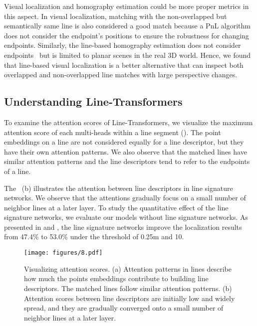 \documentclass[letterpaper, 10 pt, journal, twoside]{ieeetran}
\begin{document}
Visual localization and homography estimation could be more proper metrics in this aspect. In visual localization, matching with the non-overlapped but semantically same line is also considered a good match because a \ac{PnL} algorithm does not consider the endpoint's positions to ensure the robustness for changing endpoints. Similarly, the line-based homography estimation does not consider endpoints~\cite{Dubrofsky2008} but is limited to planar scenes in the real 3D world. Hence, we found that line-based visual localization is a better alternative that can inspect both overlapped and non-overlapped line matches with large perspective changes.

\subsection{Understanding Line-Transformers}
\label{sec:analysis}

To examine the attention scores of Line-Transformers, we visualize the maximum attention score of each multi-heads within a line segment (). The point embeddings on a line are not considered equally for a line descriptor, but they have their own attention patterns. We also observe that the matched lines have similar attention patterns and the line descriptors tend to refer to the endpoints of a line.

The ~(b) illustrates the attention between line descriptors in line signature networks. We observe that the attentions gradually focus on a small number of neighbor lines at a later layer. To study the quantitative effect of the line signature networks, we evaluate our models without line signature networks. As presented in  and , the line signature networks improve the localization results from 47.4\% to 53.0\% under the threshold of 0.25m and 10\textdegree.

\begin{figure*}[!t]
	\centering
	\texttt{[image: figures/8.pdf]}
	\caption{Visualizing attention scores. (a) Attention patterns in lines describe how much the points embeddings contribute to building line descriptors. The matched lines follow similar attention patterns. (b) Attention scores between line descriptors are initially low and widely spread, and they are gradually converged onto a small number of neighbor lines at a later layer.}
	\label{fig:vis_attn}
	\vspace{-5mm}
\end{figure*}
\end{document}
